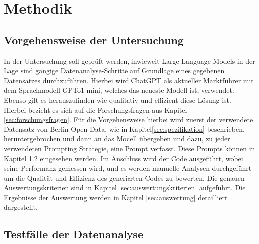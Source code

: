 \documentclass[11pt,a4paper]{article}
\begin{document}
\section{Methodik}
\label{sec:methodik}
\subsection{Vorgehensweise der Untersuchung}
    In der Untersuchung soll geprüft werden, inwieweit Large Language Models in der Lage sind gängige Datenanalyse-Schritte auf Grundlage eines gegebenen Datensatzes durchzuführen. Hierbei wird ChatGPT als aktueller Marktführer mit dem Sprachmodell GPTo1-mini, welches das neueste Modell ist, verwendet. Ebenso gilt es herauszufinden wie qualitativ und effizient diese Lösung ist. Hierbei bezieht es sich auf die Forschungsfragen aus Kapitel \ref{sec:forschungsfragen}.
    Für die Vorgehensweise hierbei wird zuerst der verwendete Datensatz von Berlin Open Data, wie in Kapitel\ref{sec:spezifikation} beschrieben, heruntergebrochen und dann an das Modell übergeben und dazu, zu jeder verwendeten Prompting Strategie, eine Prompt verfasst. Diese Prompts können in Kapitel \ref{sec:testfaelle} eingesehen werden.
    Im Anschluss wird der Code ausgeführt, wobei seine Performanz gemessen wird, und es werden manuelle Analysen durchgeführt um die Qualität und Effizienz des generierten Codes zu bewerten. Die genauen Auswertungskriterien sind in Kapitel \ref{sec:auswertungskriterien} aufgeführt.
    Die Ergebnisse der Auswertung werden in Kapitel \ref{sec:auswertung} detailliert dargestellt.

\subsection{Testfälle der Datenanalyse}
\label{sec:testfaelle}
\end{document}

